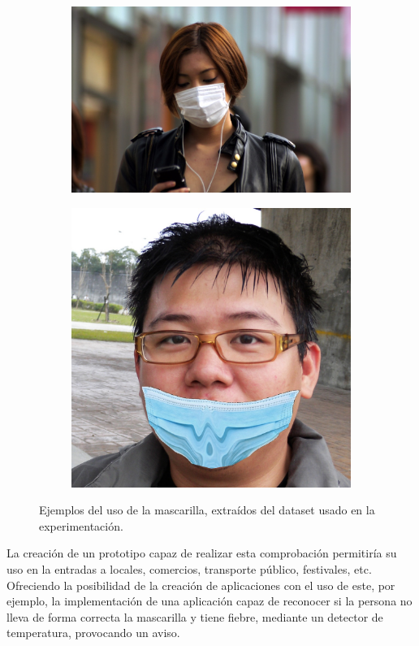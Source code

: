 \begin{figure}[htp]
\begin{subfigure}{0.4\linewidth}
		\includegraphics[width=\linewidth]{imagenes/dataset2-2.jpg}
		\caption{}
		\label{fig:2b}
	\end{subfigure}\hfill	
	\begin{subfigure}{0.3\linewidth}
		\includegraphics[width=\linewidth]{imagenes/dataset2-3.jpg}
		\caption{}
		\label{fig:2c}
	\end{subfigure}
	\caption[Ejemplos del uso de la mascarilla]{Ejemplos del uso de la mascarilla, extraídos del dataset usado en la experimentación.}
	\label{fig:2}
\end{figure}

La creación de un prototipo capaz de realizar esta comprobación permitiría su uso en la entradas a locales, comercios, transporte público, festivales, etc. Ofreciendo la posibilidad de la creación de aplicaciones con el uso de este, por ejemplo, la implementación de una aplicación capaz de reconocer si la persona no lleva de forma correcta la mascarilla y tiene fiebre, mediante un detector de temperatura, provocando un aviso.
